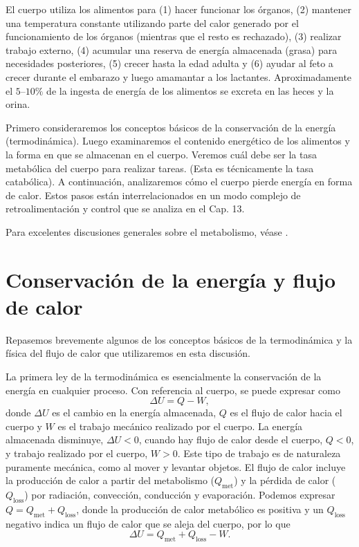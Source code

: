 \documentclass[12pt]{book}
\begin{document}
El cuerpo utiliza los alimentos para (1) hacer funcionar los órganos, (2) mantener una temperatura constante utilizando parte del calor generado por el funcionamiento de los órganos (mientras que el resto es rechazado), (3) realizar trabajo externo, (4) acumular una reserva de energía almacenada (grasa) para necesidades posteriores, (5) crecer hasta la edad adulta y (6) ayudar al feto a crecer durante el embarazo y luego amamantar a los lactantes. Aproximadamente el $5\text{--}10\%$ de la ingesta de energía de los alimentos se excreta en las heces y la orina.

Primero consideraremos los conceptos básicos de la conservación de la energía (termodinámica). Luego examinaremos el contenido energético de los alimentos y la forma en que se almacenan en el cuerpo. Veremos cuál debe ser la tasa metabólica del cuerpo para realizar tareas. (Esta es técnicamente la tasa catabólica). A continuación, analizaremos cómo el cuerpo pierde energía en forma de calor. Estos pasos están interrelacionados en un modo complejo de retroalimentación y control que se analiza en el Cap. 13.

Para excelentes discusiones generales sobre el metabolismo, véase \cite{10,11,19,20,35,57,89,106}.

\section{Conservación de la energía y flujo de calor}

Repasemos brevemente algunos de los conceptos básicos de la termodinámica y la física del flujo de calor que utilizaremos en esta discusión.

La primera ley de la termodinámica es esencialmente la conservación de la energía en cualquier proceso. Con referencia al cuerpo, se puede expresar como
\begin{equation}
\Delta U = Q - W,
\label{eq:61}
\end{equation}
donde $\Delta U$ es el cambio en la energía almacenada, $Q$ es el flujo de calor hacia el cuerpo y $W$ es el trabajo mecánico realizado por el cuerpo. La energía almacenada disminuye, $\Delta U < 0$, cuando hay flujo de calor desde el cuerpo, $Q < 0$, y trabajo realizado por el cuerpo, $W > 0$. Este tipo de trabajo es de naturaleza puramente mecánica, como al mover y levantar objetos. El flujo de calor incluye la producción de calor a partir del metabolismo ($Q_{\text{met}}$) y la pérdida de calor ($Q_{\text{loss}}$) por radiación, convección, conducción y evaporación. Podemos expresar $Q = Q_{\text{met}} + Q_{\text{loss}}$, donde la producción de calor metabólico es positiva y un $Q_{\text{loss}}$ negativo indica un flujo de calor que se aleja del cuerpo, por lo que
\begin{equation}
\Delta U = Q_{\text{met}} + Q_{\text{loss}} - W.
\label{eq:62}
\end{equation}
\end{document}
